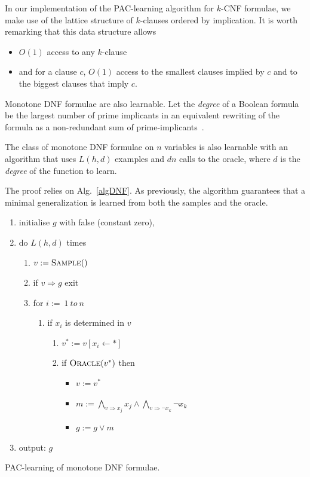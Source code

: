 \documentclass{llncs}
\begin{document}
In our implementation of the PAC-learning algorithm for $k$-CNF formulae,
we make use of the lattice structure of $k$-clauses ordered by implication.
It is worth remarking that this data structure allows
\begin{itemize}
	\item $O(1)$ access to any $k$-clause
	\item and for a clause $c$, $O(1)$ access to the smallest clauses implied by $c$ and to the biggest clauses that imply $c$.
\end{itemize}

Monotone DNF formulae are also learnable.
Let the \emph{degree} of a Boolean formula be the largest number of prime
implicants in an equivalent rewriting of the formula as a non-redundant sum of
prime-implicants~\cite{Valiant84cacm}.


\begin{theorem}\label{thm:mdnf}
    The class of monotone DNF formulae on $n$ variables is also learnable with an
    algorithm that uses $L(h,d)$ examples and $d n$ calls to the oracle,
    where $d$ is the \emph{degree} of the function to learn.
\end{theorem}

The proof relies on Alg.~\ref{algDNF}. As previously, the algorithm guarantees that a minimal generalization is learned from both the samples and the oracle.

\begin{algorithm}
\begin{enumerate}
\item initialise $g$ with false (constant zero),
\item
do $L(h,d)$ times 
\begin{enumerate}
\item $v:=\textsc{Sample}()$
	\item 
	if $v\Rightarrow g$ exit
\item for $i:=\ 1\ to \ n$
\begin{enumerate}
\item if $x_i$ is determined in $v$
\begin{enumerate}
\item $v^*:=v[x_i\leftarrow *]$
\item if $\textsc{Oracle}(v^*)$ then 
\begin{itemize}
\item $v:=v^*$
\item $m:=\bigwedge_{v\Rightarrow x_j} x_j\wedge\bigwedge_{v\Rightarrow\neg x_k}\neg x_k$ 
\item $g:=g\vee m$
\end{itemize}
\end{enumerate}
\end{enumerate}
\end{enumerate}
\item output: $g$
\end{enumerate}
\caption{PAC-learning of monotone DNF formulae.\label{algDNF}}
\end{algorithm}
\end{document}
